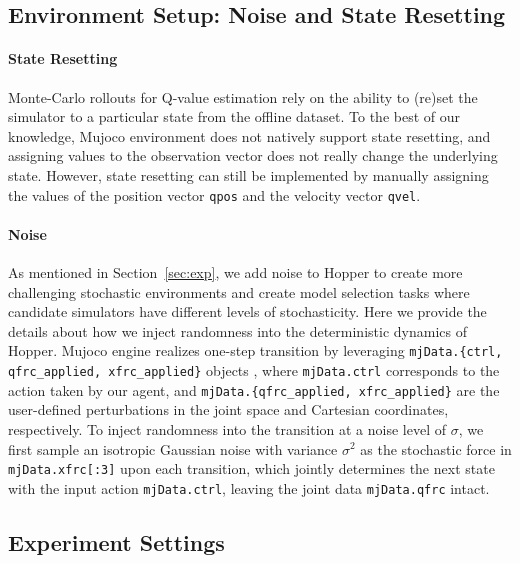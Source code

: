 \subsection{Environment Setup: Noise and State Resetting} \label{app:env}
\paragraph{State Resetting} Monte-Carlo rollouts for Q-value estimation rely on the ability to (re)set the simulator to a particular state from the offline dataset. 
To the best of our knowledge, Mujoco environment does not natively support state resetting, and assigning values to the observation vector does not really change the underlying state.  However, state resetting can still be implemented by manually assigning the values of  the position vector \texttt{qpos} and the velocity vector \texttt{qvel}. %

\paragraph{Noise} As mentioned in Section~\ref{sec:exp}, we add noise to Hopper to create more challenging stochastic environments and create model selection tasks where candidate simulators have different levels of stochasticity. Here we provide the details about how we inject randomness into the deterministic dynamics of Hopper. 
Mujoco engine realizes one-step transition by leveraging \texttt{mjData.\{ctrl, qfrc\_applied, xfrc\_applied\}} objects \cite{mujoco_doc}, where \texttt{mjData.ctrl} corresponds to the action taken by our agent, and \texttt{mjData.\{qfrc\_applied, xfrc\_applied\}} are the user-defined perturbations in the joint space and Cartesian coordinates, respectively. %
%
To inject randomness into the transition at a noise level of $\sigma$, we first sample an isotropic Gaussian noise with variance $\sigma^2$ as the stochastic force in \texttt{mjData.xfrc[:3]} upon each transition, which jointly determines the next state with the input action \texttt{mjData.ctrl}, leaving the joint data \texttt{mjData.qfrc} intact. %

\subsection{Experiment Settings} \label{app:setup}
